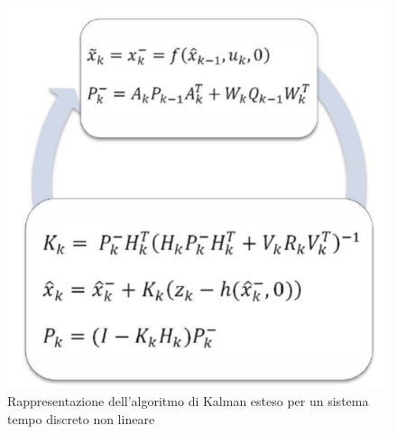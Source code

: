 \begin{figure}[H]  
	\centering 
	\includegraphics[scale=0.8]{kalman/kalmanfilterNL.png}
	\caption{Rappresentazione dell'algoritmo di Kalman esteso per un sistema tempo discreto non lineare}
	\label{fig:kalmanfilterNL}
\end{figure}







